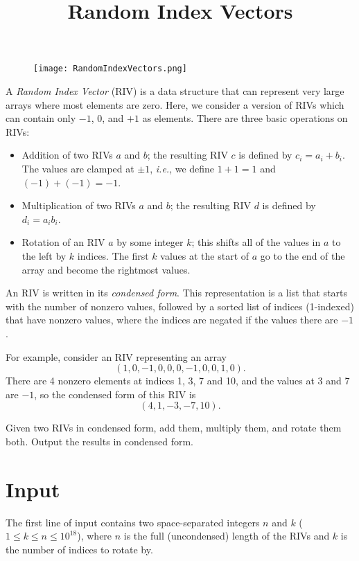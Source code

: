 \documentclass{article}
\title{Random Index Vectors}
\date{}
\begin{document}
\maketitle
\begin{figure}[h!]
\centering
\texttt{[image: RandomIndexVectors.png]}
\end{figure}


A \emph{Random Index Vector} (RIV) is a data structure that can represent
very large arrays where most elements are zero.
Here, we consider a version of RIVs which can contain only $-1$, $0$, and
$+1$ as elements. There are three basic operations on RIVs:

\begin{itemize}
\item Addition of two RIVs $a$ and $b$;
the resulting RIV $c$ is defined by $c_i = a_i+b_i$.
The values are clamped at $\pm 1$, \emph{i.e.}, we define $1+1=1$ and $(-1)+(-1)=-1$.

\item Multiplication of two RIVs $a$ and $b$; the resulting RIV $d$ is defined by $d_i=a_i b_i$.

\item Rotation of an RIV $a$ by some integer $k$; this shifts all of the values
in $a$ to the left by $k$ indices. The first $k$ values at the start of $a$ go
to the end of the array and become the rightmost values.
\end{itemize}

An RIV is written in its \emph{condensed form}. This representation is
a list that starts with the number of nonzero values, followed by
a sorted list of indices (1-indexed) that have nonzero values,
where the indices are negated if the values there are $-1$.

For example, consider an RIV representing an array
\[
(1, 0, -1, 0, 0, 0, -1, 0, 0, 1, 0).
\]
There are 4 nonzero elements at indices 1, 3, 7 and 10, and the
values at 3 and 7 are $-1$, so the condensed form of this RIV is
\[
(4, 1, -3, -7, 10).
\]

Given two RIVs in condensed form, add them, multiply them,
and rotate them both. Output the results in condensed form.

\section{Input}

The first line of input contains two space-separated integers $n$ and $k$ ($1\le k \le n\le 10^{18}$), where $n$ is the full (uncondensed) length of the
RIVs and $k$ is the number of indices to rotate by.
\end{document}
